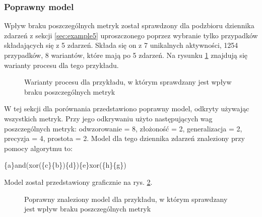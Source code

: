 \subsubsection{Poprawny model}
Wpływ braku poszczególnych metryk został sprawdzony dla podzbioru dziennika zdarzeń z sekcji \ref{sec:example5} uproszczonego poprzez wybranie tylko przypadków składających się z 5 zdarzeń. 
Składa się on z 7 unikalnych aktywności, 1254 przypadków, 8 wariantów, które mają po 5 zdarzeń. Na rysunku \ref{fig:p6_variants} znajdują się warianty procesu dla tego przykładu. 

\begin{figure}[!ht]
	\caption{\label{fig:p6_variants}Warianty procesu dla przykładu, w którym sprawdzany jest wpływ braku poszczególnych metryk}
\end{figure}

W tej sekcji dla porównania przedstawiono poprawny model, odkryty używając wszystkich metryk. Przy jego odkrywaniu użyto następujących wag poszczególnych metryk: odwzorowanie = 8, złożoność = 2, generalizacja = 2, precyzja = 4, prostota = 2. Model dla tego dziennika zdarzeń znaleziony przy pomocy algorytmu to:
\begin{center}
	\{a\}and(xor(\{c\}\{b\})\{d\})\{e\}xor(\{h\}\{g\})
\end{center}
Model został przedstawiony graficznie na rys. \ref{fig:p6_model}.

\begin{figure}[!ht]
	\caption{\label{fig:p6_model}Poprawny znaleziony model dla przykładu, w którym sprawdzany jest wpływ braku poszczególnych metryk}
\end{figure}

